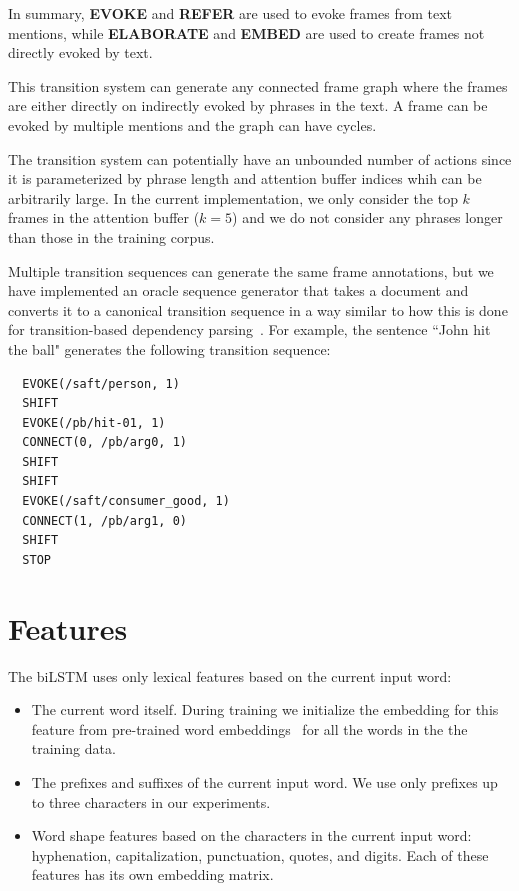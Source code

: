 \documentclass[11pt,a4paper]{article}
\begin{document}
In summary, {\bf EVOKE} and {\bf REFER} are used to evoke frames from text
mentions, while {\bf ELABORATE} and {\bf EMBED} are used to create frames not
directly evoked by text.

This transition system can generate any connected frame graph where the frames
are either directly on indirectly evoked by phrases in the text. A frame
can be evoked by multiple mentions and the graph can have cycles.

The transition system can potentially have an unbounded number of actions since
it is parameterized by phrase length and attention buffer indices whih can be
arbitrarily large. In the current implementation, we only consider the
top $k$ frames in the attention buffer ($k=5$) and we do not consider any phrases
longer than those in the training corpus.

Multiple transition sequences can generate the same frame annotations, but we
have implemented an oracle sequence generator that takes a document and converts
it to a canonical transition sequence in a way similar to how this is done
for transition-based dependency parsing~\cite{nivre2006}. For example, the sentence
``John hit the ball" generates the following transition sequence:
\begin{verbatim}
  EVOKE(/saft/person, 1)
  SHIFT
  EVOKE(/pb/hit-01, 1)
  CONNECT(0, /pb/arg0, 1)
  SHIFT
  SHIFT
  EVOKE(/saft/consumer_good, 1)
  CONNECT(1, /pb/arg1, 0)
  SHIFT
  STOP
\end{verbatim}

\section{Features}
\label{sec:features}

The biLSTM uses only lexical features based on the current input word:

\begin{itemize}
  \item The current word itself. During training we initialize the embedding
  for this feature from pre-trained word embeddings~\cite{mikolov2013} for all
  the words in the the training data.
  \item The prefixes and suffixes of the current input word. We use only
  prefixes up to three characters in our experiments.
  \item Word shape features based on the characters in the current input word:
  hyphenation, capitalization, punctuation, quotes, and digits. Each of these
  features has its own embedding matrix.
\end{itemize}
\end{document}
